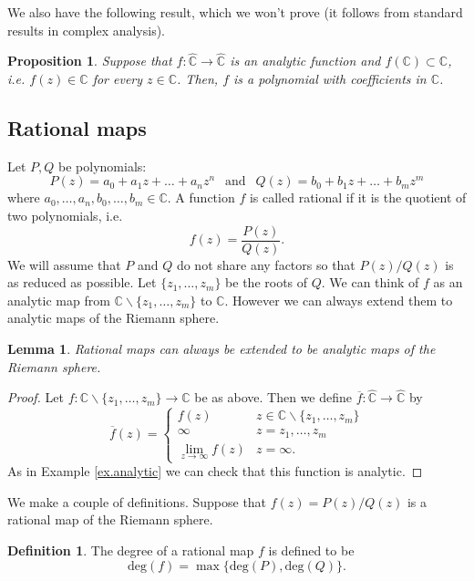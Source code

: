 \documentclass[12pt]{article}
\newtheorem{lemma}[theorem]{Lemma}
\newtheorem{proposition}[theorem]{Proposition}
\theoremstyle{definition}
\newtheorem{definition}[theorem]{Definition}
\theoremstyle{remark}
\begin{document}
We also have the following result, which we won't prove (it follows from standard results in complex analysis).

\begin{proposition}
Suppose that $f: \widehat{\mathbb{C}} \to \widehat{\mathbb{C}}$ is an analytic function and $f(\mathbb{C}) \subset \mathbb{C}$, i.e. $f(z) \in \mathbb{C}$ for every $z\in\mathbb{C}$. Then, $f$ is a polynomial with coefficients in $\mathbb{C}$.
\end{proposition}




\subsection{Rational maps}
Let $P, Q$ be polynomials:
\[
P(z) = a_0 + a_1z + \ldots + a_nz^n \ \ \text{ and } \ \ Q(z) = b_0 + b_1 z + \ldots + b_mz^m
\]
where $a_0,\ldots,a_n, b_0, \ldots, b_m \in \mathbb{C}$. A function $f$ is called rational if it is the quotient of two polynomials, i.e.
\[
f(z) = \frac{P(z)}{Q(z)}.
\]
We will assume that $P$ and $Q$ do not share any factors so that $P(z)/Q(z)$ is as reduced as possible. Let $\{ z_1, \ldots, z_m\}$ be the roots of $Q$. We can think of $f$ as an analytic map from $\mathbb{C}\backslash \{ z_1, \ldots, z_m \}$ to $\mathbb{C}$. However we can always extend them to analytic maps of the Riemann sphere.
\begin{lemma}
Rational maps can always be extended to be analytic maps of the Riemann sphere. 
\end{lemma}
\begin{proof}
Let $f : \mathbb{C}\backslash \{ z_1, \ldots, z_m \} \to \mathbb{C}$ be as above. Then we define $\overline{f} : \widehat{\mathbb{C}} \to \widehat{\mathbb{C}}$ by
\[
\overline{f}(z) = \begin{cases}
       f(z) &z \in \mathbb{C}\backslash\{z_1, \ldots, z_m \} \\
       \infty &z=z_1, \ldots, z_m\\
       \lim_{z\to\infty} f(z) &z = \infty.
     \end{cases}
\]
As in Example \ref{ex.analytic} we can check that this function is analytic.
\end{proof}
We make a couple of definitions. Suppose that  $f(z) = P(z)/Q(z)$  is a rational map of the Riemann sphere.
\begin{definition}
The degree of a rational map $f$ is defined to be
\[
\text{deg}(f) = \max\{ \text{deg}(P), \text{deg}(Q)\}.
\]
\end{definition}
\end{document}
